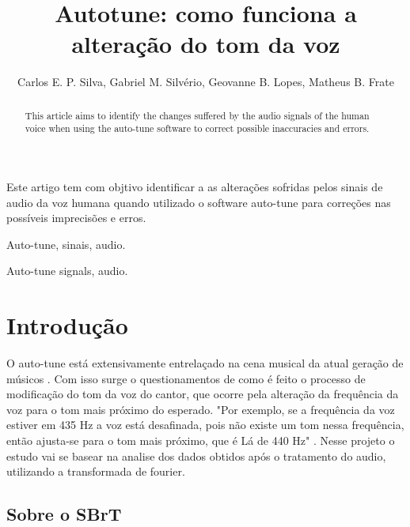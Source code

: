 \documentclass{sbrt}
\begin{document}
\title{Autotune: como funciona a alteração do tom da voz}

\author{Carlos E. P. Silva, Gabriel M. Silvério, Geovanne B. Lopes, Matheus B. Frate}

\maketitle


\begin{resumo}
Este artigo tem com objtivo identificar a as alterações sofridas pelos sinais de audio da voz humana quando utilizado o software auto-tune para correções nas possíveis imprecisões e erros.
\end{resumo}

\begin{chave}
Auto-tune, sinais, audio.
\end{chave}


\begin{abstract}
This article aims to identify the changes suffered by the audio signals of the human voice when using the auto-tune software to correct possible inaccuracies and errors.
\end{abstract}

\begin{keywords}
Auto-tune signals, audio.
\end{keywords}


\section{Introdução}

O auto-tune está extensivamente entrelaçado na cena musical da atual geração de músicos \cite{ref1}. Com isso surge o questionamentos de como é feito o processo de modificação do tom da voz do cantor, que ocorre pela alteração da frequência da voz para o tom mais próximo do esperado.
"Por exemplo, se a frequência da voz estiver em 435 Hz a voz está desafinada, pois não existe um tom nessa frequência, então ajusta-se para o tom mais próximo, que é Lá de 440 Hz" \cite{ref2}. Nesse projeto o estudo vai se basear na analise dos dados obtidos após o tratamento do audio, utilizando a transformada de fourier.

\subsection{Sobre o SBrT}
\end{document}

